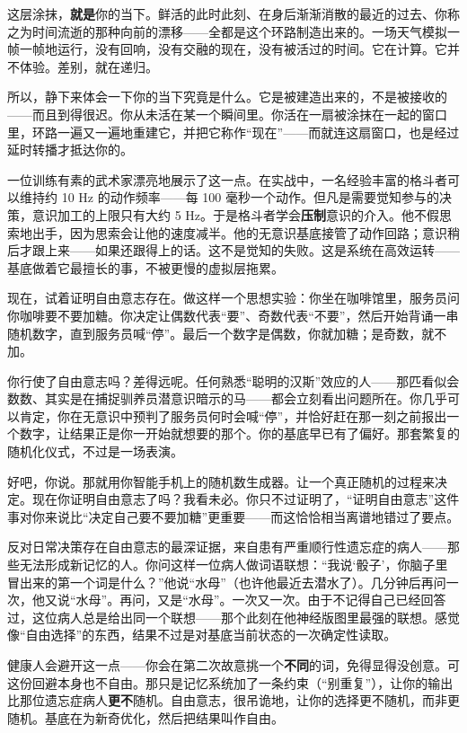\documentclass[11pt, twoside, openright]{book}
\begin{document}
这层涂抹，\textbf{就是}你的当下。鲜活的此时此刻、在身后渐渐消散的最近的过去、你称之为时间流逝的那种向前的漂移------全都是这个环路制造出来的。一场天气模拟一帧一帧地运行，没有回响，没有交融的现在，没有被活过的时间。它在计算。它并不体验。差别，就在递归。

所以，静下来体会一下你的当下究竟是什么。它是被建造出来的，不是被接收的------而且到得很迟。你从未活在某一个瞬间里。你活在一扇被涂抹在一起的窗口里，环路一遍又一遍地重建它，并把它称作“现在”------而就连这扇窗口，也是经过延时转播才抵达你的。

一位训练有素的武术家漂亮地展示了这一点。在实战中，一名经验丰富的格斗者可以维持约 10 Hz 的动作频率------每 100 毫秒一个动作。但凡是需要觉知参与的决策，意识加工的上限只有大约 5 Hz。于是格斗者学会\textbf{压制}意识的介入。他不假思索地出手，因为思索会让他的速度减半。他的无意识基底接管了动作回路；意识稍后才跟上来------如果还跟得上的话。这不是觉知的失败。这是系统在高效运转------基底做着它最擅长的事，不被更慢的虚拟层拖累。

现在，试着证明自由意志存在。做这样一个思想实验：你坐在咖啡馆里，服务员问你咖啡要不要加糖。你决定让偶数代表“要”、奇数代表“不要”，然后开始背诵一串随机数字，直到服务员喊“停”。最后一个数字是偶数，你就加糖；是奇数，就不加。

你行使了自由意志吗？差得远呢。任何熟悉“聪明的汉斯”效应的人------那匹看似会数数、其实是在捕捉驯养员潜意识暗示的马------都会立刻看出问题所在。你几乎可以肯定，你在无意识中预判了服务员何时会喊“停”，并恰好赶在那一刻之前报出一个数字，让结果正是你一开始就想要的那个。你的基底早已有了偏好。那套繁复的随机化仪式，不过是一场表演。

好吧，你说。那就用你智能手机上的随机数生成器。让一个真正随机的过程来决定。现在你证明自由意志了吗？我看未必。你只不过证明了，“证明自由意志”这件事对你来说比“决定自己要不要加糖”更重要------而这恰恰相当离谱地错过了要点。

反对日常决策存在自由意志的最深证据，来自患有严重顺行性遗忘症的病人------那些无法形成新记忆的人。你问这样一位病人做词语联想：“我说‘骰子’，你脑子里冒出来的第一个词是什么？”他说“水母”（也许他最近去潜水了）。几分钟后再问一次，他又说“水母”。再问，又是“水母”。一次又一次。由于不记得自己已经回答过，这位病人总是给出同一个联想------那个此刻在他神经版图里最强的联想。感觉像“自由选择”的东西，结果不过是对基底当前状态的一次确定性读取。

健康人会避开这一点------你会在第二次故意挑一个\textbf{不同}的词，免得显得没创意。可这份回避本身也不自由。那只是记忆系统加了一条约束（“别重复”），让你的输出比那位遗忘症病人\textbf{更不}随机。自由意志，很吊诡地，让你的选择更不随机，而非更随机。基底在为新奇优化，然后把结果叫作自由。
\end{document}
